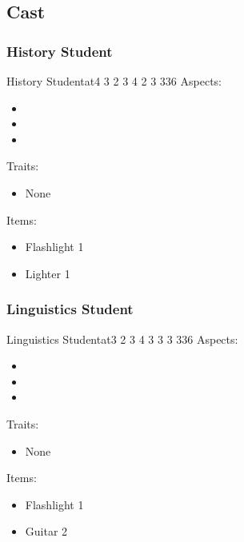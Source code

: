 \documentclass[11pt]{article}
\begin{document}
{\subsection{Cast}
\label{sec:org1c2e1ce}

\subsubsection{History Student}
\label{sec:org61a9884}

\begin{npc}{History Student}{at}{4 3 2 3 4 2 3 3}{36}
Aspects:
\begin{itemize}
\item {}
\item {}
\item {}
\end{itemize}
\columnbreak

Traits:
\begin{itemize}
\item None
\end{itemize}

Items:
\begin{itemize}
\item Flashlight 1
\item Lighter 1
\end{itemize}
\end{npc}
\subsubsection{Linguistics Student}
\label{sec:org6325f6f}

\begin{npc}{Linguistics Student}{at}{3 2 3 4 3 3 3 3}{36}
Aspects:
\begin{itemize}
\item {}
\item {}
\item {}
\end{itemize}
\columnbreak

Traits:
\begin{itemize}
\item None
\end{itemize}

Items:
\begin{itemize}
\item Flashlight 1
\item Guitar 2
\end{itemize}
\end{npc}
}
\end{document}
